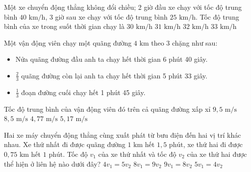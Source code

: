 \begin{ex} Một xe chuyển động thẳng không đổi chiều; 2 giờ đầu xe chạy với tốc độ trung bình $40\text{ km/h}$, 3 giờ sau xe chạy với tốc độ trung bình $25\text{ km/h}$. Tốc độ trung bình của xe trong suốt thời gian chạy là
\choice
{$30\text{ km/h}$}
{\True $31\text{ km/h}$}
{$32\text{ km/h}$}
{$33\text{ km/h}$}
\end{ex}

\begin{ex} Một vận động viên chạy một quãng đường $4\text{ km}$ theo 3 chặng như sau:
\begin{itemize}
    \item Nửa quãng đường đầu anh ta chạy hết thời gian 6 phút 40 giây.
    \item $\frac{2}{3}$ quãng đường còn lại anh ta chạy hết thời gian 5 phút 33 giây.
    \item $\frac{1}{3}$ đoạn đường cuối chạy hết 1 phút 45 giây.
\end{itemize}
Tốc độ trung bình của vận động viên đó trên cả quãng đường xấp xỉ
\choice
{$9{,}5\text{ m/s}$}
{$8{,}5\text{ m/s}$}
{\True $4{,}77\text{ m/s}$}
{$5{,}17\text{ m/s}$}
\end{ex}

\begin{ex} Hai xe máy chuyển động thẳng cùng xuất phát từ bưu điện đến hai vị trí khác nhau. Xe thứ nhất đi được quãng đường $1\text{ km}$ hết $1{,}5\text{ phút}$, xe thứ hai đi được $0{,}75\text{ km}$ hết $1\text{ phút}$. Tốc độ $v_1$ của xe thứ nhất và tốc độ $v_2$ của xe thứ hai được thể hiện ở liên hệ nào dưới đây?
\choice
{$4v_1 = 5v_2$}
{$8v_1 = 9v_2$}
{\True $9v_1 = 8v_2$}
{$5v_1 = 4v_2$}
\end{ex}

